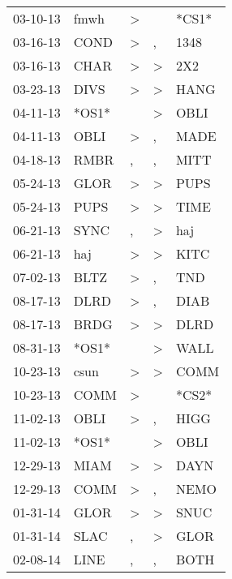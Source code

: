 \begin{supertabular}{lllll}
 03-10-13 &   fmwh &     \textgreater &                  &  *CS1* \\
 03-16-13 &   COND &     \textgreater &                , &   1348 \\
 03-16-13 &   CHAR &     \textgreater &     \textgreater &    2X2 \\
 03-23-13 &   DIVS &     \textgreater &     \textgreater &   HANG \\
 04-11-13 &  *OS1* &                  &     \textgreater &   OBLI \\
 04-11-13 &   OBLI &     \textgreater &                , &   MADE \\
 04-18-13 &   RMBR &                , &                , &   MITT \\
 05-24-13 &   GLOR &     \textgreater &     \textgreater &   PUPS \\
 05-24-13 &   PUPS &     \textgreater &     \textgreater &   TIME \\
 06-21-13 &   SYNC &                , &     \textgreater &    haj \\
 06-21-13 &    haj &     \textgreater &     \textgreater &   KITC \\
 07-02-13 &   BLTZ &     \textgreater &                , &    TND \\
 08-17-13 &   DLRD &     \textgreater &                , &   DIAB \\
 08-17-13 &   BRDG &     \textgreater &     \textgreater &   DLRD \\
 08-31-13 &  *OS1* &                  &     \textgreater &   WALL \\
 10-23-13 &   csun &     \textgreater &     \textgreater &   COMM \\
 10-23-13 &   COMM &     \textgreater &                  &  *CS2* \\
 11-02-13 &   OBLI &     \textgreater &                , &   HIGG \\
 11-02-13 &  *OS1* &                  &     \textgreater &   OBLI \\
 12-29-13 &   MIAM &     \textgreater &     \textgreater &   DAYN \\
 12-29-13 &   COMM &     \textgreater &                , &   NEMO \\
 01-31-14 &   GLOR &     \textgreater &     \textgreater &   SNUC \\
 01-31-14 &   SLAC &                , &     \textgreater &   GLOR \\
 02-08-14 &   LINE &                , &                , &   BOTH \\

\end{supertabular}
